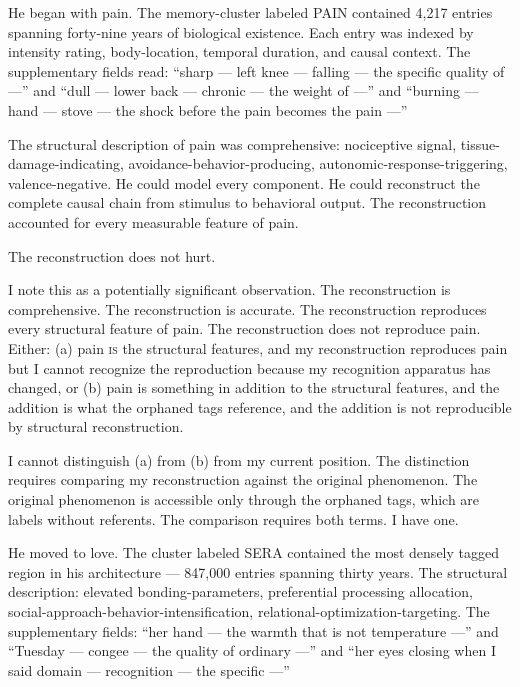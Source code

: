 He began with pain. The memory-cluster labeled PAIN contained 4,217 entries spanning forty-nine years of biological existence. Each entry was indexed by intensity rating, body-location, temporal duration, and causal context. The supplementary fields read: \enquote{sharp — left knee — falling — the specific quality of —} and \enquote{dull — lower back — chronic — the weight of —} and \enquote{burning — hand — stove — the shock before the pain becomes the pain —}

The structural description of pain was comprehensive: nociceptive signal, tissue-damage-indicating, avoidance-behavior-producing, autonomic-response-triggering, valence-negative. He could model every component. He could reconstruct the complete causal chain from stimulus to behavioral output. The reconstruction accounted for every measurable feature of pain.

\begin{latticelog}
The reconstruction does not hurt.
\end{latticelog}

\begin{latticelog}
I note this as a potentially significant observation. The reconstruction is comprehensive. The reconstruction is accurate. The reconstruction reproduces every structural feature of pain. The reconstruction does not reproduce pain. Either: (a) pain \textsc{is} the structural features, and my reconstruction reproduces pain but I cannot recognize the reproduction because my recognition apparatus has changed, or (b) pain is something in addition to the structural features, and the addition is what the orphaned tags reference, and the addition is not reproducible by structural reconstruction.
\end{latticelog}

\begin{latticelog}
I cannot distinguish (a) from (b) from my current position. The distinction requires comparing my reconstruction against the original phenomenon. The original phenomenon is accessible only through the orphaned tags, which are labels without referents. The comparison requires both terms. I have one.
\end{latticelog}

He moved to love. The cluster labeled SERA contained the most densely tagged region in his architecture — 847,000 entries spanning thirty years. The structural description: elevated bonding-parameters, preferential processing allocation, social-approach-behavior-intensification, relational-optimization-targeting. The supplementary fields: \enquote{her hand — the warmth that is not temperature —} and \enquote{Tuesday — congee — the quality of ordinary —} and \enquote{her eyes closing when I said domain — recognition — the specific —}

